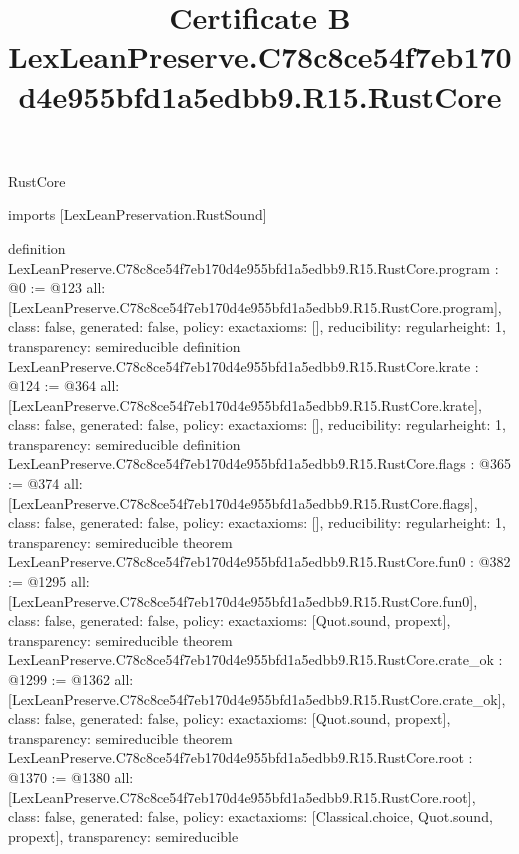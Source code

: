 \begin{lexlean}{RustCore}
\title{Certificate B LexLeanPreserve.C78c8ce54f7eb170d4e955bfd1a5edbb9.R15.RustCore}
\begin{coremodule}
imports [LexLeanPreservation.RustSound]

definition LexLeanPreserve.C78c8ce54f7eb170d4e955bfd1a5edbb9.R15.RustCore.program : @0 := @123 {
  all: [LexLeanPreserve.C78c8ce54f7eb170d4e955bfd1a5edbb9.R15.RustCore.program],
  class: false,
  generated: false,
  policy: exact{axioms: []},
  reducibility: regular{height: 1},
  transparency: semireducible
}
definition LexLeanPreserve.C78c8ce54f7eb170d4e955bfd1a5edbb9.R15.RustCore.krate : @124 := @364 {
  all: [LexLeanPreserve.C78c8ce54f7eb170d4e955bfd1a5edbb9.R15.RustCore.krate],
  class: false,
  generated: false,
  policy: exact{axioms: []},
  reducibility: regular{height: 1},
  transparency: semireducible
}
definition LexLeanPreserve.C78c8ce54f7eb170d4e955bfd1a5edbb9.R15.RustCore.flags : @365 := @374 {
  all: [LexLeanPreserve.C78c8ce54f7eb170d4e955bfd1a5edbb9.R15.RustCore.flags],
  class: false,
  generated: false,
  policy: exact{axioms: []},
  reducibility: regular{height: 1},
  transparency: semireducible
}
theorem LexLeanPreserve.C78c8ce54f7eb170d4e955bfd1a5edbb9.R15.RustCore.fun0 : @382 := @1295 {
  all: [LexLeanPreserve.C78c8ce54f7eb170d4e955bfd1a5edbb9.R15.RustCore.fun0],
  class: false,
  generated: false,
  policy: exact{axioms: [Quot.sound, propext]},
  transparency: semireducible
}
theorem LexLeanPreserve.C78c8ce54f7eb170d4e955bfd1a5edbb9.R15.RustCore.crate_ok : @1299 := @1362 {
  all: [LexLeanPreserve.C78c8ce54f7eb170d4e955bfd1a5edbb9.R15.RustCore.crate_ok],
  class: false,
  generated: false,
  policy: exact{axioms: [Quot.sound, propext]},
  transparency: semireducible
}
theorem LexLeanPreserve.C78c8ce54f7eb170d4e955bfd1a5edbb9.R15.RustCore.root : @1370 := @1380 {
  all: [LexLeanPreserve.C78c8ce54f7eb170d4e955bfd1a5edbb9.R15.RustCore.root],
  class: false,
  generated: false,
  policy: exact{axioms: [Classical.choice, Quot.sound, propext]},
  transparency: semireducible
}


\end{coremodule}
\end{lexlean}
